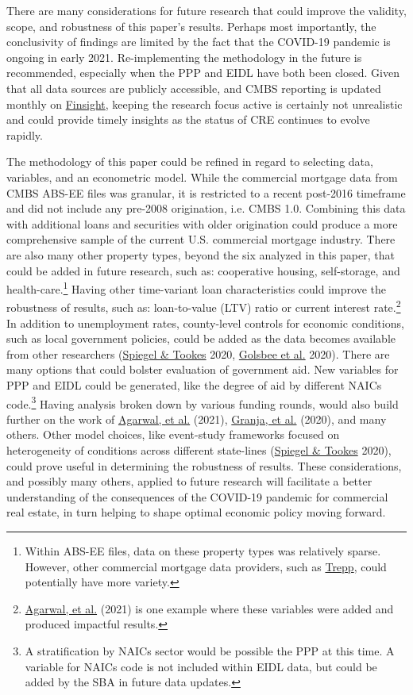 \documentclass[11pt]{article} %
\begin{document}
There are many considerations for future research that could improve the validity, scope, and robustness of this paper's results. Perhaps most importantly, the conclusivity of findings are limited by the fact that the COVID-19 pandemic is ongoing in early 2021. Re-implementing the methodology in the future is recommended, especially when the PPP and EIDL have both been closed. Given that all data sources are publicly accessible, and CMBS reporting is updated monthly on \href{https://finsight.com/}{Finsight}, keeping the research focus active is certainly not unrealistic and could provide timely insights as the status of CRE continues to evolve rapidly. 

The methodology of this paper could be refined in regard to selecting data, variables, and an econometric model. While the commercial mortgage data from CMBS ABS-EE files was granular, it is restricted to a recent post-2016 timeframe and did not include any pre-2008 origination, i.e. CMBS 1.0. Combining this data with additional loans and securities with older origination could produce a more comprehensive sample of the current U.S. commercial mortgage industry. There are also many other property types, beyond the six analyzed in this paper, that could be added in future research, such as: cooperative housing, self-storage, and health-care.\footnote{Within ABS-EE files, data on these property types was relatively sparse. However, other commercial mortgage data providers, such as \href{https://www.trepp.com/}{Trepp}, could potentially have more variety.} Having other time-variant loan characteristics could improve the robustness of results, such as: loan-to-value (LTV) ratio or current interest rate.\footnote{\hyperlink{Agarwal}{Agarwal, et al.} (2021) is one example where these variables were added and produced impactful results.} In addition to unemployment rates, county-level controls for economic conditions, such as local government policies, could be added as the data becomes available from other researchers (\hyperlink{Spiegel}{Spiegel \& Tookes} 2020, \hyperlink{Golsbee}{Golsbee et al.} 2020). There are many options that could bolster evaluation of government aid. New variables for PPP and EIDL could be generated, like the degree of aid by different NAICs code.\footnote{A stratification by NAICs sector would be possible the PPP at this time. A variable for NAICs code is not included within EIDL data, but could be added by the SBA in future data updates.} Having analysis broken down by various funding rounds, would also build further on the work of \hyperlink{Agarwal}{Agarwal, et al.} (2021), \hyperlink{Granja}{Granja, et al.} (2020), and many others. Other model choices, like event-study frameworks focused on heterogeneity of conditions across different state-lines (\hyperlink{Spiegel}{Spiegel \& Tookes} 2020), could prove useful in determining the robustness of results. These considerations, and possibly many others, applied to future research will facilitate a better understanding of the consequences of the COVID-19 pandemic for commercial real estate, in turn helping to shape optimal economic policy moving forward. 
\end{document}

